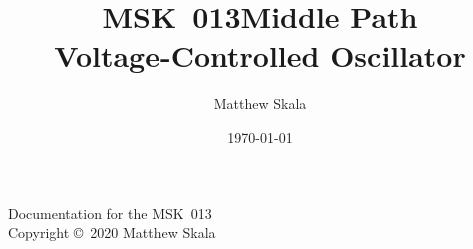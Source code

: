 \documentclass{ncmanual}
\title{MSK~013\quad Middle Path\\Voltage-Controlled Oscillator}
\author{Matthew Skala}
\date{\today}
\begin{document}
\maketitle


\begin{copyrightpage}
Documentation for the MSK~013\\
Copyright \copyright\ 2020 Matthew Skala

\GPLThreeStatement
\end{copyrightpage}

\tableofcontents


\texdependspdfworkaround











\end{document}
